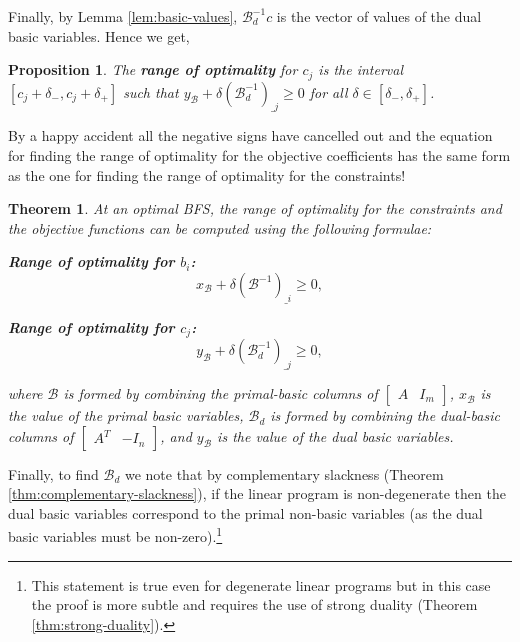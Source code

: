 \documentclass[
]{book}
\newtheorem{theorem}{Theorem}[chapter]
\newtheorem{proposition}{Proposition}[chapter]
\theoremstyle{definition}
\theoremstyle{definition}
\theoremstyle{definition}
\theoremstyle{definition}
\theoremstyle{remark}
\begin{document}
Finally, by Lemma \ref{lem:basic-values}, \(\mathcal{B}_d^{-1} c\) is the vector of values of the
dual basic variables. Hence we get,

\begin{proposition}
The \textbf{range of optimality} for \(c_j\) is the interval \([c_j + \delta_-, c_j + \delta_+]\) such that \(y_{\mathcal{B}} + \delta (\mathcal{B}_d^{-1})_{\_j} \ge 0\) for all \(\delta \in [\delta_-, \delta_+]\).
\end{proposition}

By a happy accident all the negative signs have cancelled out and the equation for finding the range
of optimality for the objective coefficients has the same form as the one for finding the range of
optimality for the constraints!

\begin{theorem}
\protect\hypertarget{thm:range-of-optimality}{}\label{thm:range-of-optimality}At an optimal BFS, the range of optimality for the constraints and the objective functions can be
computed using the following formulae:

\textbf{Range of optimality for \(b_i\):}
\begin{equation}
  x_{\mathcal{B}} + \delta (\mathcal{B}^{-1})_{\_i} \ge 0,
\end{equation}

\textbf{Range of optimality for \(c_j\):}
\begin{equation}
  y_{\mathcal{B}} + \delta (\mathcal{B}_d^{-1})_{\_j} \ge 0,
\end{equation}

where \(\mathcal{B}\) is formed by combining the primal-basic columns of \(\begin{bmatrix} A & I_m \end{bmatrix}\), \(x_{\mathcal{B}}\) is the value of the primal basic variables, \(\mathcal{B}_d\) is
formed by combining the dual-basic columns of \(\begin{bmatrix} A^T & -I_n \end{bmatrix}\), and
\(y_{\mathcal{B}}\) is the value of the dual basic variables.
\end{theorem}

Finally, to find \(\mathcal{B}_d\) we note that by complementary slackness (Theorem \ref{thm:complementary-slackness}), if the linear program is non-degenerate then the dual basic variables correspond to the primal non-basic variables (as the dual basic variables must be non-zero).\footnote{This statement is true even for degenerate linear programs but in this case the proof is more subtle and requires the use of strong duality (Theorem \ref{thm:strong-duality}).}
\end{document}
